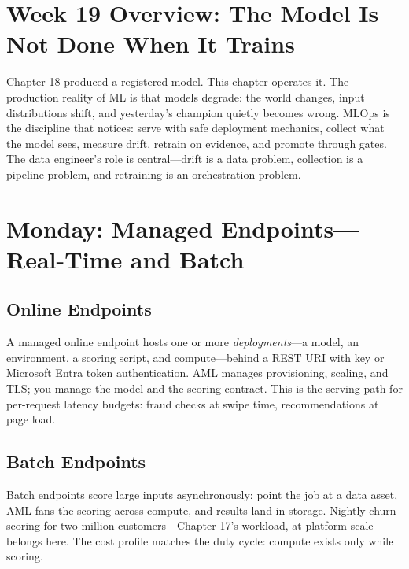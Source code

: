 \section{Week 19 Overview: The Model Is Not Done When It Trains}
Chapter 18 produced a registered model. This chapter operates it. The production reality of ML is that models degrade: the world changes, input distributions shift, and yesterday's champion quietly becomes wrong. MLOps is the discipline that notices: serve with safe deployment mechanics, collect what the model sees, measure drift, retrain on evidence, and promote through gates. The data engineer's role is central---drift is a data problem, collection is a pipeline problem, and retraining is an orchestration problem.

\section{Monday: Managed Endpoints---Real-Time and Batch}

\subsection{Online Endpoints}
A managed online endpoint hosts one or more \emph{deployments}---a model, an environment, a scoring script, and compute---behind a REST URI with key or Microsoft Entra token authentication. AML manages provisioning, scaling, and TLS; you manage the model and the scoring contract. This is the serving path for per-request latency budgets: fraud checks at swipe time, recommendations at page load.

\subsection{Batch Endpoints}
Batch endpoints score large inputs asynchronously: point the job at a data asset, AML fans the scoring across compute, and results land in storage. Nightly churn scoring for two million customers---Chapter 17's workload, at platform scale---belongs here. The cost profile matches the duty cycle: compute exists only while scoring.

